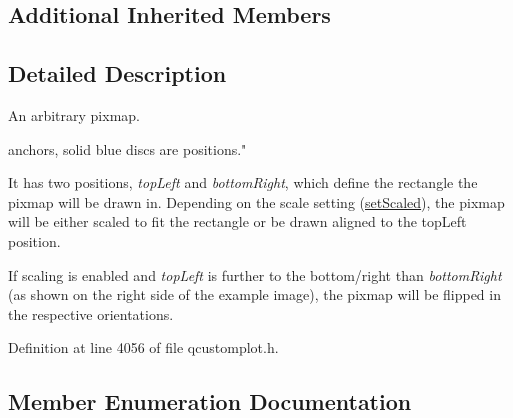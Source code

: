 \subsection*{Additional Inherited Members}


\subsection{Detailed Description}
An arbitrary pixmap. 

 anchors, solid blue discs are positions."

It has two positions, {\itshape top\+Left} and {\itshape bottom\+Right}, which define the rectangle the pixmap will be drawn in. Depending on the scale setting (\hyperlink{class_q_c_p_item_pixmap_ab4d44529a1c6c8d37d0ea7560e042777}{set\+Scaled}), the pixmap will be either scaled to fit the rectangle or be drawn aligned to the top\+Left position.

If scaling is enabled and {\itshape top\+Left} is further to the bottom/right than {\itshape bottom\+Right} (as shown on the right side of the example image), the pixmap will be flipped in the respective orientations. 

Definition at line 4056 of file qcustomplot.\+h.



\subsection{Member Enumeration Documentation}
\hypertarget{class_q_c_p_item_pixmap_a0ea7f65edb7395e02de521915f221174}{}
